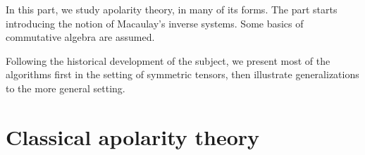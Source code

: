 In this part, we study apolarity theory, in many of its forms. The part starts introducing the notion of Macaulay's inverse systems. Some basics of commutative algebra are assumed.

Following the historical development of the subject, we present most of the algorithms first in the setting of symmetric tensors, then illustrate generalizations to the more general setting. 

\chapter{Classical apolarity theory}
\label{tensorRank-chapter-apolarity}


